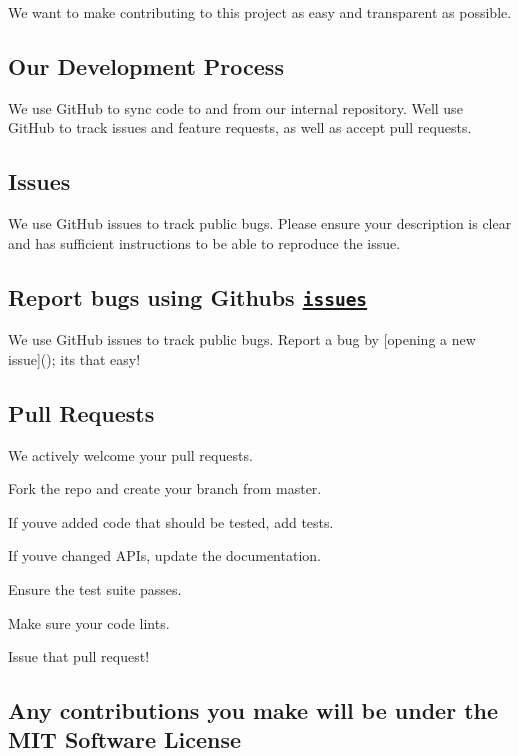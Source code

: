 We want to make contributing to this project as easy and transparent as possible.

\subsection*{Our Development Process}

We use Git\+Hub to sync code to and from our internal repository. We\textquotesingle{}ll use Git\+Hub to track issues and feature requests, as well as accept pull requests.

\subsection*{Issues}

We use Git\+Hub issues to track public bugs. Please ensure your description is clear and has sufficient instructions to be able to reproduce the issue.

\subsection*{Report bugs using Github\textquotesingle{}s \href{https://github.com/MRKonrad/tomato/issues}{\tt issues}}

We use Git\+Hub issues to track public bugs. Report a bug by \mbox{[}opening a new issue\mbox{]}(); it\textquotesingle{}s that easy!

\subsection*{Pull Requests}

We actively welcome your pull requests.


\begin{DoxyEnumerate}
\item Fork the repo and create your branch from {\ttfamily master}.
\item If you\textquotesingle{}ve added code that should be tested, add tests.
\item If you\textquotesingle{}ve changed A\+P\+Is, update the documentation.
\item Ensure the test suite passes.
\item Make sure your code lints.
\item Issue that pull request!
\end{DoxyEnumerate}

\subsection*{Any contributions you make will be under the M\+IT Software License}

